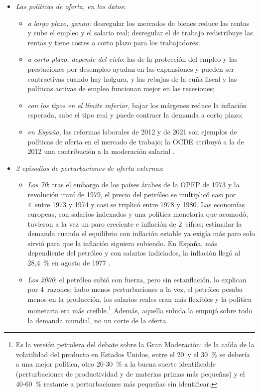 \documentclass[11pt]{article}
\begin{document}
\begin{itemize}
\item \emph{Las políticas de oferta, en los datos}:
  \begin{itemize}
  \item \emph{a largo plazo, ganan}: desregular los mercados de bienes reduce las rentas y sube el empleo y el salario real; desregular el de trabajo redistribuye las rentas y tiene costes a corto plazo para los trabajadores\nocite{BlanchardGiavazzi2003};
  \item \emph{a corto plazo, depende del ciclo}: las de la protección del empleo y las prestaciones por desempleo ayudan en las expansiones y pueden ser contractivas cuando hay holgura, y las rebajas de la cuña fiscal y las políticas activas de empleo funcionan mejor en las recesiones\nocite{DuvalFurceri2018};
  \item \emph{con los tipos en el límite inferior}, bajar los márgenes reduce la inflación esperada, sube el tipo real y puede contraer la demanda a corto plazo\nocite{EggertssonFerreroRaffo2014};
  \item \emph{en España}, las reformas laborales de 2012\nocite{BOE2012RDL3,BOE2012Ley3} y de 2021\nocite{BOE2021RDL32} son ejemplos de políticas de oferta en el mercado de trabajo; la OCDE atribuyó a la de 2012 una contribución a la moderación salarial\nocite{OCDE2014ReformaLaboral} .
  \end{itemize}
\item \emph{2 episodios de perturbaciones de oferta externas}:
  \begin{itemize}
  \item \emph{Los 70}: tras el embargo de los países árabes de la OPEP de 1973 y la revolución iraní de 1979, el precio del petróleo se multiplicó casi por 4~entre 1973 y 1974 y casi se triplicó entre 1978 y 1980\nocite{Hamilton2011Historical,BancoMundial2026PinkSheet}. Las economías europeas, con salarios indexados y una política monetaria que acomodó, tuvieron a la vez un paro creciente e inflación de 2~cifras\nocite{BrunoSachs1985Economics}; estimular la demanda cuando el equilibrio con inflación estable ya exigía más paro solo sirvió para que la inflación siguiera subiendo\nocite{CarlinSoskice2015Macroeconomics}. En España, más dependiente del petróleo y con salarios indiciados, la inflación llegó al 28,4~\% en agosto de 1977\nocite{INE2026IPCSerie} .
  \item \emph{Los 2000}: el petróleo subió con fuerza, pero sin estanflación. \textcite{BlanchardGali2010Oil} lo explican por 4~razones: hubo menos perturbaciones a la vez, el petróleo pesaba menos en la producción, los salarios reales eran más flexibles y la política monetaria era más creíble.\footnote{Es la versión petrolera del debate sobre la Gran Moderación: de la caída de la volatilidad del producto en Estados Unidos, entre el 20~y el 30~\% se debería a una mejor política, otro 20-30~\% a la buena suerte identificable (perturbaciones de productividad y de materias primas más pequeñas) y el 40-60~\% restante a perturbaciones más pequeñas sin identificar\nocite{StockWatson2003Has}.} Además, aquella subida la empujó sobre todo la demanda mundial, no un corte de la oferta\nocite{Kilian2009NotAll}.

\end{itemize}
\end{itemize}
\end{document}
